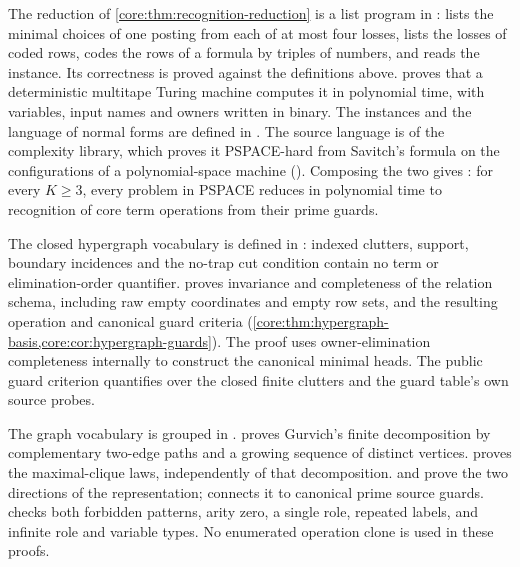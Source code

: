 The reduction of \cref{core:thm:recognition-reduction} is a list program
in :  lists the minimal
choices of one posting from each of at most four losses,
 lists the losses of coded rows,
 codes the rows of a formula by triples of
numbers, and  reads the instance. Its
correctness is proved against the definitions above.
 proves that a
deterministic multitape Turing machine computes it in polynomial time,
with variables, input names and owners written in binary. The instances
and the language of normal forms are defined in
. The source language is
 of the complexity library, which proves
it PSPACE-hard from Savitch's formula on the configurations of a
polynomial-space machine (). Composing the two
gives : for every $K\ge3$, every
problem in PSPACE reduces in polynomial time to recognition of core term
operations from their prime guards.

The closed hypergraph vocabulary is defined in
: indexed clutters, support,
boundary incidences and the no-trap cut condition contain no term or
elimination-order quantifier.  proves
invariance and completeness of the relation schema, including raw empty
coordinates and empty row sets, and the resulting operation and canonical
guard criteria (\cref{core:thm:hypergraph-basis,core:cor:hypergraph-guards}).
The proof uses owner-elimination completeness internally to construct the
canonical minimal heads. The public guard criterion quantifies over the
closed finite clutters and the guard table's own source probes.

The graph vocabulary is grouped in .
 proves Gurvich's finite
decomposition by complementary two-edge paths and a growing sequence of
distinct vertices.  proves the
maximal-clique laws, independently of that decomposition.
 and
 prove the two directions of
the representation;  connects it
to canonical prime source guards. 
checks both forbidden patterns, arity zero, a single role, repeated labels,
and infinite role and variable types. No enumerated operation clone is
used in these proofs.

